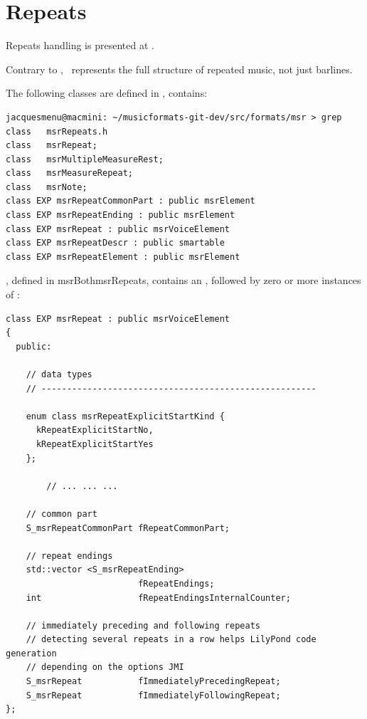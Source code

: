 \section{Repeats}\label{Repeats}

Repeats handling is presented at .

Contrary to \mxml, \mf\ represents the full structure of repeated music, not just barlines.

The following classes are defined in , contains:
\begin{lstlisting}[language=Terminal]
jacquesmenu@macmini: ~/musicformats-git-dev/src/formats/msr > grep class   msrRepeats.h
class   msrRepeat;
class   msrMultipleMeasureRest;
class   msrMeasureRepeat;
class   msrNote;
class EXP msrRepeatCommonPart : public msrElement
class EXP msrRepeatEnding : public msrElement
class EXP msrRepeat : public msrVoiceElement
class EXP msrRepeatDescr : public smartable
class EXP msrRepeatElement : public msrElement
\end{lstlisting}

, defined in msrBoth{msrRepeats}, contains an , followed by zero or more instances of :
\begin{lstlisting}[language=CPlusPlus]
class EXP msrRepeat : public msrVoiceElement
{
  public:

    // data types
    // ------------------------------------------------------

    enum class msrRepeatExplicitStartKind {
      kRepeatExplicitStartNo,
      kRepeatExplicitStartYes
    };

		// ... ... ...

    // common part
    S_msrRepeatCommonPart fRepeatCommonPart;

    // repeat endings
    std::vector <S_msrRepeatEnding>
                          fRepeatEndings;
    int                   fRepeatEndingsInternalCounter;

    // immediately preceding and following repeats
    // detecting several repeats in a row helps LilyPond code generation
    // depending on the options JMI
    S_msrRepeat           fImmediatelyPrecedingRepeat;
    S_msrRepeat           fImmediatelyFollowingRepeat;
};
\end{lstlisting}

